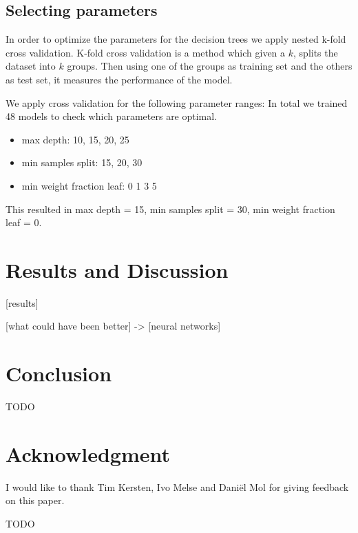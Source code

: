 \documentclass[conference]{IEEEtran}
\begin{document}
\subsection{Selecting parameters}
In order to optimize the parameters for the decision trees we apply nested k-fold cross validation. 
K-fold cross validation is a method which given a $k$, splits the dataset into $k$ groups. 
Then using one of the groups as training set and the others as test set, it measures the performance of the model. 

We apply cross validation for the following parameter ranges: 
In total we trained 48 models to check which parameters are optimal. 
\begin{itemize}
	\item max depth: 10, 15, 20, 25 
	\item min samples split: 15, 20, 30
	\item min weight fraction leaf: 0 1 3 5
\end{itemize}
This resulted in max depth = 15, min samples split = 30, min weight fraction leaf = 0.

\section{Results and Discussion}
[results]

[what could have been better] -> [neural networks]

\section{Conclusion}
TODO

\section*{Acknowledgment}
I would like to thank Tim Kersten, Ivo Melse and Dani\"{e}l Mol for giving feedback on this paper.


\begin{thebibliography}{00}
 TODO
\end{thebibliography}
\end{document}
